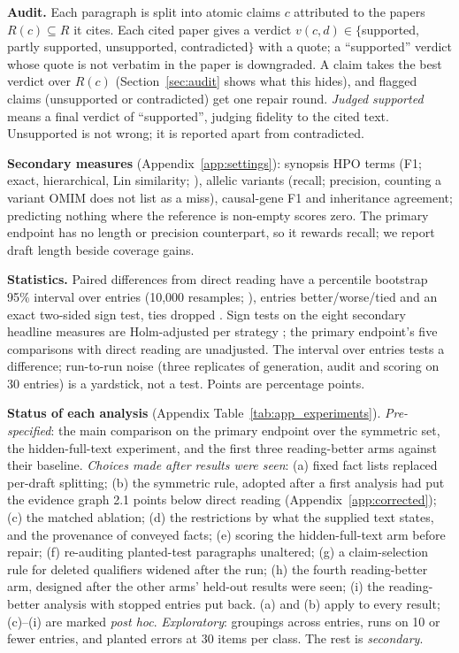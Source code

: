 \documentclass{article} %
\begin{document}
\textbf{Audit.} Each paragraph is split into atomic claims $c$ attributed to the papers $R(c)\subseteq R$ it cites. Each cited paper gives a verdict $v(c,d)\in\{$supported, partly supported, unsupported, contradicted$\}$ with a quote; a ``supported'' verdict whose quote is not verbatim in the paper is downgraded. A claim takes the best verdict over $R(c)$ (Section~\ref{sec:audit} shows what this hides), and flagged claims (unsupported or contradicted) get one repair round. \emph{Judged supported} means a final verdict of ``supported'', judging fidelity to the cited text. Unsupported is not wrong; it is reported apart from contradicted.

\textbf{Secondary measures} (Appendix~\ref{app:settings}): synopsis HPO terms (F1; exact, hierarchical, Lin similarity; \citealp{Khler2009ClinicalDiagnostics,Resnik1995UsingInformation}), allelic variants (recall; precision, counting a variant OMIM does not list as a miss), causal-gene F1 and inheritance agreement; predicting nothing where the reference is non-empty scores zero. The primary endpoint has no length or precision counterpart, so it rewards recall; we report draft length beside coverage gains.

\textbf{Statistics.} Paired differences from direct reading have a percentile bootstrap 95\% interval over entries (10,000 resamples; \citealp{Efron1979BootstrapMethods}), entries better/worse/tied and an exact two-sided sign test, ties dropped \citep{Dixon1946StatisticalSign}. Sign tests on the eight secondary headline measures are Holm-adjusted per strategy \citep{holm1979simple}; the primary endpoint's five comparisons with direct reading are unadjusted. The interval over entries tests a difference; run-to-run noise (three replicates of generation, audit and scoring on 30 entries) is a yardstick, not a test. Points are percentage points.

\textbf{Status of each analysis} (Appendix Table~\ref{tab:app_experiments}). \emph{Pre-specified}: the main comparison on the primary endpoint over the symmetric set, the hidden-full-text experiment, and the first three reading-better arms against their baseline. \emph{Choices made after results were seen}: (a) fixed fact lists replaced per-draft splitting; (b) the symmetric rule, adopted after a first analysis had put the evidence graph 2.1 points below direct reading (Appendix~\ref{app:corrected}); (c) the matched ablation; (d) the restrictions by what the supplied text states, and the provenance of conveyed facts; (e) scoring the hidden-full-text arm before repair; (f) re-auditing planted-test paragraphs unaltered; (g) a claim-selection rule for deleted qualifiers widened after the run; (h) the fourth reading-better arm, designed after the other arms' held-out results were seen; (i) the reading-better analysis with stopped entries put back. (a) and (b) apply to every result; (c)--(i) are marked \emph{post hoc}. \emph{Exploratory}: groupings across entries, runs on 10 or fewer entries, and planted errors at 30 items per class. The rest is \emph{secondary}.
\end{document}
